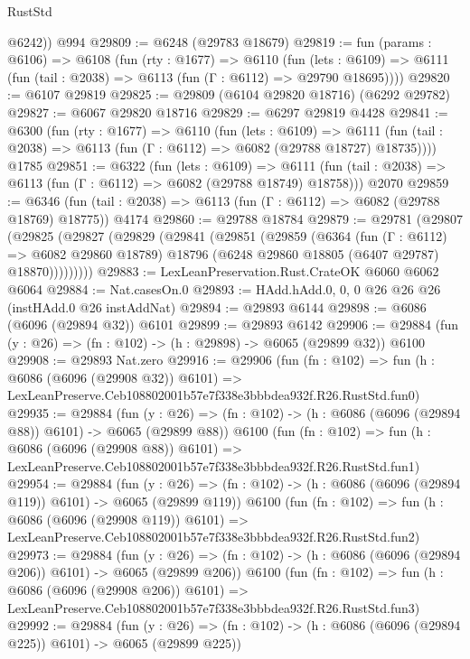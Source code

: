 \begin{lexlean}{RustStd}
\begin{coremodule}
        @6242))
    @994
@29809 := @6248 (@29783 @18679)
@29819 := fun (params : @6106) =>
  @6108
    (fun (rty : @1677) =>
    @6110
      (fun (lets : @6109) =>
      @6111 (fun (tail : @2038) => @6113 (fun (Γ : @6112) => @29790 @18695))))
@29820 := @6107 @29819
@29825 := @29809 (@6104 @29820 @18716) (@6292 @29782)
@29827 := @6067 @29820 @18716
@29829 := @6297 @29819 @4428
@29841 := @6300
    (fun (rty : @1677) =>
    @6110
      (fun (lets : @6109) =>
      @6111 (fun (tail : @2038) => @6113 (fun (Γ : @6112) => @6082 (@29788 @18727) @18735))))
    @1785
@29851 := @6322
    (fun (lets : @6109) =>
    @6111 (fun (tail : @2038) => @6113 (fun (Γ : @6112) => @6082 (@29788 @18749) @18758)))
    @2070
@29859 := @6346
    (fun (tail : @2038) => @6113 (fun (Γ : @6112) => @6082 (@29788 @18769) @18775))
    @4174
@29860 := @29788 @18784
@29879 := @29781
    (@29807
      (@29825
        (@29827
          (@29829
            (@29841
              (@29851
                (@29859
                  (@6364
                    (fun (Γ : @6112) => @6082 @29860 @18789)
                    @18796
                    (@6248 @29860 @18805 (@6407 @29787) @18870)))))))))
@29883 := LexLeanPreservation.Rust.CrateOK @6060 @6062 @6064
@29884 := Nat.casesOn.{0}
@29893 := HAdd.hAdd.{0, 0, 0} @26 @26 @26 (instHAdd.{0} @26 instAddNat)
@29894 := @29893 @6144
@29898 := @6086 (@6096 (@29894 @32)) @6101
@29899 := @29893 @6142
@29906 := @29884 (fun (y : @26) => (fn : @102) -> (h : @29898) -> @6065 (@29899 @32)) @6100
@29908 := @29893 Nat.zero
@29916 := @29906
    (fun (fn : @102) =>
    fun (h : @6086 (@6096 (@29908 @32)) @6101) =>
    LexLeanPreserve.Ceb108802001b57e7f338e3bbbdea932f.R26.RustStd.fun0)
@29935 := @29884
    (fun (y : @26) => (fn : @102) -> (h : @6086 (@6096 (@29894 @88)) @6101) -> @6065 (@29899 @88))
    @6100
    (fun (fn : @102) =>
    fun (h : @6086 (@6096 (@29908 @88)) @6101) =>
    LexLeanPreserve.Ceb108802001b57e7f338e3bbbdea932f.R26.RustStd.fun1)
@29954 := @29884
    (fun (y : @26) => (fn : @102) -> (h : @6086 (@6096 (@29894 @119)) @6101) -> @6065 (@29899 @119))
    @6100
    (fun (fn : @102) =>
    fun (h : @6086 (@6096 (@29908 @119)) @6101) =>
    LexLeanPreserve.Ceb108802001b57e7f338e3bbbdea932f.R26.RustStd.fun2)
@29973 := @29884
    (fun (y : @26) => (fn : @102) -> (h : @6086 (@6096 (@29894 @206)) @6101) -> @6065 (@29899 @206))
    @6100
    (fun (fn : @102) =>
    fun (h : @6086 (@6096 (@29908 @206)) @6101) =>
    LexLeanPreserve.Ceb108802001b57e7f338e3bbbdea932f.R26.RustStd.fun3)
@29992 := @29884
    (fun (y : @26) => (fn : @102) -> (h : @6086 (@6096 (@29894 @225)) @6101) -> @6065 (@29899 @225))

\end{coremodule}
\end{lexlean}
